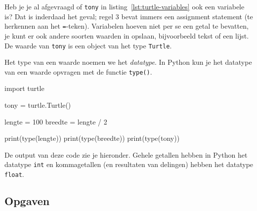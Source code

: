 \documentclass[../main]{subfiles}
\begin{document}
\begin{infobox}[Datatypes]
Heb je je al afgevraagd of \texttt{tony} in listing~\ref{lst:turtle-variables} ook een variabele is? Dat is inderdaad het geval; regel 3 bevat immers een assignment statement (te herkennen aan het \texttt{=}-teken). Variabelen hoeven niet per se een getal te bevatten, je kunt er ook andere soorten waarden in opslaan, bijvoorbeeld tekst of een lijst. De waarde van \texttt{tony} is een object van het type \texttt{Turtle}.

Het type van een waarde noemen we het \emph{datatype}. In Python kun je het datatype van een waarde opvragen met de functie \texttt{type()}.

\begin{python}[style=mu, numbers=none]
import turtle

tony = turtle.Turtle()

lengte = 100
breedte = lengte / 2

print(type(lengte))
print(type(breedte))
print(type(tony))
\end{python}

De output van deze code zie je hieronder. Gehele getallen hebben in Python het datatype \texttt{int} en kommagetallen (en resultaten van delingen) hebben het datatype \texttt{float}.

\begin{center}
\end{center}

\end{infobox}
\subsection*{Opgaven}
\end{document}
